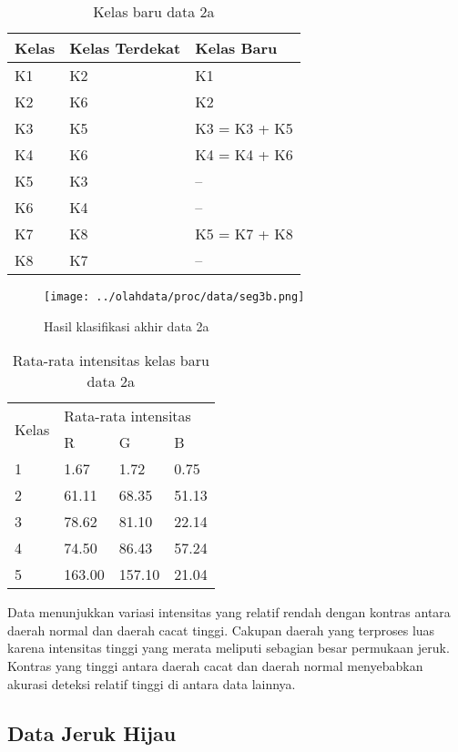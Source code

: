 \documentclass[laporan.tex]{subfiles}
\begin{document}
\begin{table}[h!]
\centering
\begin{tabular}{|l|l|l|}
\hline
Kelas & Kelas Terdekat & Kelas Baru \\
\hline
K1 & K2 & K1 \\
K2 & K6 & K2 \\
K3 & K5 & K3 = K3 + K5 \\
K4 & K6 & K4 = K4 + K6 \\
K5 & K3 & -- \\
K6 & K4 & -- \\
K7 & K8 & K5 = K7 + K8 \\
K8 & K7 & -- \\
\hline
\end{tabular}
\caption{Kelas baru data 2a}
\label{table:clsyellow2}
\end{table}

\begin{figure}[h!]
\centering
\texttt{[image: ../olahdata/proc/data/seg3b.png]}
\caption{Hasil klasifikasi akhir data 2a}
\end{figure}

\begin{table}[h!]
\centering
\begin{tabular}{|l|l|l|l|}
\cline{1-4}
\multirow{2}{*}{Kelas} & \multicolumn{3}{l|}{Rata-rata intensitas} \\
\cline{2-4}
 & R & G & B \\
\cline{1-4}
1 & 1.67 & 1.72 & 0.75 \\
2 & 61.11 & 68.35 & 51.13 \\
3 & 78.62 & 81.10 & 22.14 \\
4 & 74.50 & 86.43 & 57.24 \\
5 & 163.00 & 157.10 & 21.04 \\
\cline{1-4}
\end{tabular}
\caption{Rata-rata intensitas kelas baru data 2a}
\label{table:avgyellow2}
\end{table}

Data menunjukkan variasi intensitas yang relatif rendah dengan kontras antara daerah normal dan daerah cacat tinggi. Cakupan daerah yang terproses luas karena intensitas tinggi yang merata meliputi sebagian besar permukaan jeruk. Kontras yang tinggi antara daerah cacat dan daerah normal menyebabkan akurasi deteksi relatif tinggi di antara data lainnya.

\subsection{Data Jeruk Hijau}
\end{document}
